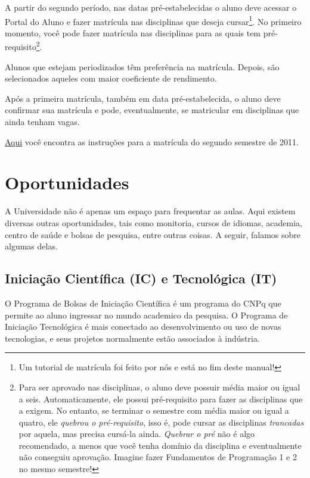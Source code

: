 \documentclass[a4paper,12pt,openany]{article}
\begin{document}
A partir do segundo período, nas datas pré-estabelecidas o aluno deve acessar o Portal do Aluno e fazer matrícula nas disciplinas que deseja cursar\footnote{Um tutorial de matrícula foi feito por nós e está no fim deste manual!}. No primeiro momento, você pode fazer matrícula nas disciplinas para as quais tem pré-requisito\footnote{Para ser aprovado nas disciplinas, o aluno deve possuir média maior ou igual a seis. Automaticamente, ele possui pré-requisito para fazer as disciplinas que a exigem. No entanto, se terminar o semestre com média maior ou igual a quatro, ele \textit{quebrou o pré-requisito}, isso é, pode cursar as disciplinas \textit{trancadas} por aquela, mas precisa cursá-la ainda. \textit{Quebrar o pré} não é algo recomendado, a menos que você tenha domínio da disciplina e eventualmente não conseguiu aprovação. Imagine fazer Fundamentos de Programação 1 e 2 no mesmo semestre!}. 

Alunos que estejam periodizados têm preferência na matrícula. Depois, são selecionados aqueles com maior coeficiente de rendimento.

Após a primeira matrícula, também em data pré-estabelecida, o aluno deve confirmar sua matrícula e pode, eventualmente, se matricular em disciplinas que ainda tenham vagas.

 \href{http://www.utfpr.edu.br/curitiba/alunos/08-07-11-instrucao-de-matricula-bacharelados-e-licenciaturas/view}{Aqui} você encontra as instruções para a matrícula do segundo semestre de 2011.


\newpage
\section{Oportunidades}

A Universidade não é apenas um espaço para frequentar as aulas. Aqui existem diversas outras oportunidades, tais como monitoria, cursos de idiomas, academia, centro de saúde e bolsas de pesquisa, entre outras coisas. A seguir, falamos sobre algumas delas.

\subsection{Iniciação Científica (IC) e Tecnológica (IT)}

O Programa de Bolsas de Iniciação Científica é um programa do CNPq que permite ao aluno ingressar no mundo academico da pesquisa. O Programa de Iniciação Tecnológica é mais conectado ao desenvolvimento ou uso de novas tecnologias, e seus projetos normalmente estão associados à indústria.
\end{document}
